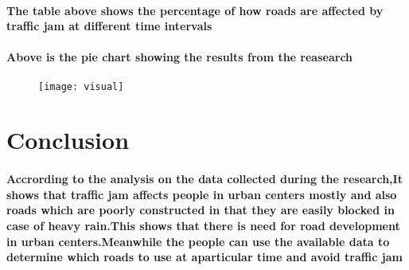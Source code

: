 \documentclass[a4paper,11pt]{article}
\begin{document}
\paragraph{The table above shows the percentage of how roads are affected by traffic jam at different time intervals}
\paragraph{Above is the pie chart showing the results from the reasearch}
\begin{figure}[h]
\texttt{[image: visual]}
\end{figure}
\cleardoublepage


\section{Conclusion}
\paragraph{Accrording to the analysis on the data collected during the research,It shows that traffic jam affects people in urban centers mostly and also roads which are poorly constructed in that they are easily blocked in case of heavy rain.This shows that there is need for road development in urban centers.Meanwhile the people can use the available data to determine which roads to use at aparticular time and avoid traffic jam}
\end{document}
